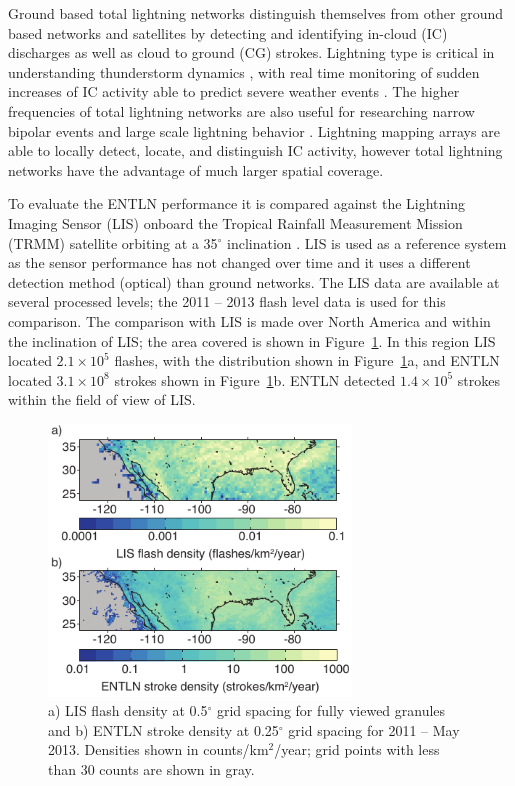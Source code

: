 Ground based total lightning networks distinguish themselves from other ground based networks and satellites by detecting and identifying in-cloud (IC) discharges as well as cloud to ground (CG) strokes.
Lightning type is critical in understanding thunderstorm dynamics \citep{Williams1989}, with real time monitoring of sudden increases of IC activity able to predict severe weather events \citep{Rudlosky2013, Darden2010, Metzger2013, Schultz2009, Schultz2011}.
The higher frequencies of total lightning networks are also useful for researching narrow bipolar events \citep{Suszcynsky2003} and large scale lightning behavior \citep{Hutchins2013}.
Lightning mapping arrays are able to locally detect, locate, and distinguish IC activity, however total lightning networks have the advantage of much larger spatial coverage.

To evaluate the ENTLN performance it is compared against the Lightning Imaging Sensor (LIS) onboard the Tropical Rainfall Measurement Mission (TRMM) satellite orbiting at a 35$^\circ$ inclination \citep{Christian1999}.
LIS is used as a reference system as the sensor performance has not changed over time and it uses a different detection method (optical) than ground networks. 
The LIS data are available at several processed levels; the 2011 -- 2013 flash level data is used for this comparison.
The comparison with LIS is made over North America and within the inclination of LIS; the area covered is shown in Figure~\ref{entln_lis:fig:density}.
In this region LIS located $2.1\times10^5$ flashes, with the distribution shown in Figure~\ref{entln_lis:fig:density}a, and ENTLN located $3.1\times10^8$ strokes shown in Figure~\ref{entln_lis:fig:density}b.
ENTLN detected $1.4\times10^5$ strokes within the field of view of LIS.

\begin{figure}[t]
   \centering
   \noindent\includegraphics[width=19pc,angle=0]{entln_lis/Figures/density.pdf}
   \caption{a) LIS flash density at 0.5$^\circ$ grid spacing for fully viewed granules and
   		b) ENTLN stroke density at 0.25$^\circ$ grid spacing for 2011 -- May 2013.
   		Densities shown in counts/km$^2$/year; grid points with less than 30 counts are shown in gray.}
   \label{entln_lis:fig:density}
\end{figure}

